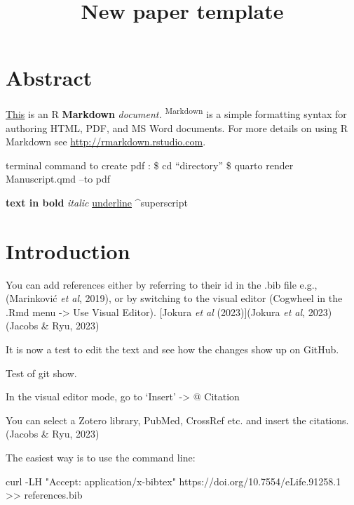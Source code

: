 \documentclass[
  11pt,
]{article}
\title{New paper template}
\subtitle{\raggedright

Author 1\textsuperscript{1,2,*} , Author 2\textsuperscript{1,2}, Author
3\textsuperscript{3}, Author 4E\textsuperscript{4}
\newline\textsuperscript{1}Heidelberg University, Centre for Organismal
Studies (COS), 69120 Heidelberg, Germany
\newline\textsuperscript{2}Affiliation 2
\newline\textsuperscript{3}Affiliation 3
\newline\textsuperscript{4}Affiliation 4\newline
\textsuperscript{*}Correspondence: xy@cos.uni-heidelberg.de}
\author{}
\date{}
\newenvironment{Shaded}{\begin{snugshade}}{\end{snugshade}}
\newcommand{\AttributeTok}[1]{\textcolor[rgb]{0.40,0.45,0.13}{#1}}
\newcommand{\ExtensionTok}[1]{\textcolor[rgb]{0.00,0.23,0.31}{#1}}
\newcommand{\NormalTok}[1]{\textcolor[rgb]{0.00,0.23,0.31}{#1}}
\newcommand{\OperatorTok}[1]{\textcolor[rgb]{0.37,0.37,0.37}{#1}}
\newcommand{\StringTok}[1]{\textcolor[rgb]{0.13,0.47,0.30}{#1}}
\renewcommand*\contentsname{Table of contents}
\newcommand\contentsname{Table of contents}
\begin{document}
\maketitle

\linenumbers

\renewcommand*\contentsname{Table of contents}
{
\hypersetup{linkcolor=}
\setcounter{tocdepth}{3}
\tableofcontents
}
\section{Abstract}\label{abstract}

\ul{This} is an R \textbf{Markdown} \emph{document.}
\textsuperscript{Markdown} is a simple formatting syntax for authoring
HTML, PDF, and MS Word documents. For more details on using R Markdown
see \url{http://rmarkdown.rstudio.com}.

terminal command to create pdf : \$ cd ``directory'' \$ quarto render
Manuscript.qmd --to pdf

\textbf{text in bold} \emph{italic} \ul{underline} \^{}superscript

\section{Introduction}\label{introduction}

You can add references either by referring to their id in the .bib file
e.g., (Marinković \emph{et al}, 2019), or by switching to the visual
editor (Cogwheel in the .Rmd menu -\textgreater{} Use Visual Editor).
{[}Jokura \emph{et al} (2023){]}(Jokura \emph{et al}, 2023)(Jacobs \&
Ryu, 2023)

It is now a test to edit the text and see how the changes show up on
GitHub.

Test of git show.

In the visual editor mode, go to `Insert' -\textgreater{} @ Citation

You can select a Zotero library, PubMed, CrossRef etc. and insert the
citations. (Jacobs \& Ryu, 2023)

The easiest way is to use the command line:

\begin{Shaded}
\begin{Highlighting}[]
\ExtensionTok{curl} \AttributeTok{{-}LH} \StringTok{"Accept: application/x{-}bibtex"}\NormalTok{ https://doi.org/10.7554/eLife.91258.1 }\OperatorTok{\textgreater{}\textgreater{}}\NormalTok{ references.bib}
\end{Highlighting}
\end{Shaded}
\end{document}
